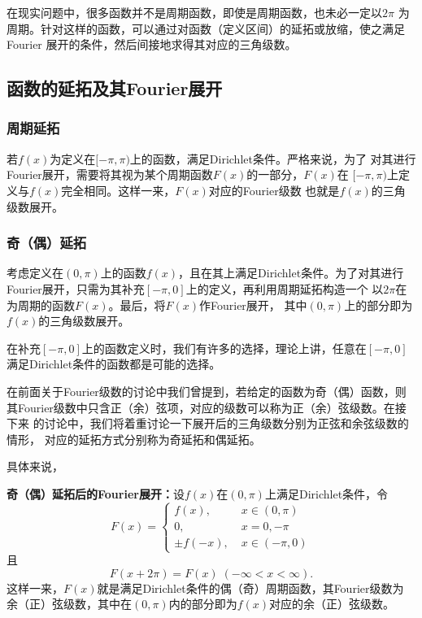 在现实问题中，很多函数并不是周期函数，即使是周期函数，也未必一定以$2\pi$
为周期。针对这样的函数，可以通过对函数（定义区间）的延拓或放缩，使之满足Fourier
展开的条件，然后间接地求得其对应的三角级数。

\subsection{函数的延拓及其Fourier展开}

\subsubsection{周期延拓}

若$f(x)$为定义在$[-\pi,\pi)$上的函数，满足Dirichlet条件。严格来说，为了
对其进行Fourier展开，需要将其视为某个周期函数$F(x)$的一部分，$F(x)$在
$[-\pi,\pi)$上定义与$f(x)$完全相同。这样一来，$F(x)$对应的Fourier级数
也就是$f(x)$的三角级数展开。

\subsubsection{奇（偶）延拓}

考虑定义在$(0,\pi)$上的函数$f(x)$，且在其上满足Dirichlet条件。为了对其进行
Fourier展开，只需为其补充$[-\pi,0]$上的定义，再利用周期延拓构造一个
以$2\pi$在为周期的函数$F(x)$。最后，将$F(x)$作Fourier展开，
其中$(0,\pi)$上的部分即为$f(x)$的三角级数展开。

在补充$[-\pi,0]$上的函数定义时，我们有许多的选择，理论上讲，任意在$[-\pi,0]$
满足Dirichlet条件的函数都是可能的选择。

在前面关于Fourier级数的讨论中我们曾提到，若给定的函数为奇（偶）函数，则
其Fourier级数中只含正（余）弦项，对应的级数可以称为正（余）弦级数。在接下来
的讨论中，我们将着重讨论一下展开后的三角级数分别为正弦和余弦级数的情形，
对应的延拓方式分别称为奇延拓和偶延拓。

具体来说，

\begin{thx}
	{\bf 奇（偶）延拓后的Fourier展开：}设$f(x)$在$(0,\pi)$上满足Dirichlet条件，令
	$$F(x)=\left\{\begin{array}{ll}
	  	f(x),\;& x\in(0,\pi)\\
	  	0,\;& x=0,-\pi\\
	  	\pm f(-x),\;& x\in(-\pi,0)
	  \end{array}\right.$$
	且
	  $$F(x+2\pi)=F(x)\;(-\infty<x<\infty).$$
	这样一来，$F(x)$就是满足Dirichlet条件的偶（奇）周期函数，其Fourier级数为
	余（正）弦级数，其中在$(0,\pi)$内的部分即为$f(x)$对应的余（正）弦级数。
\end{thx}


